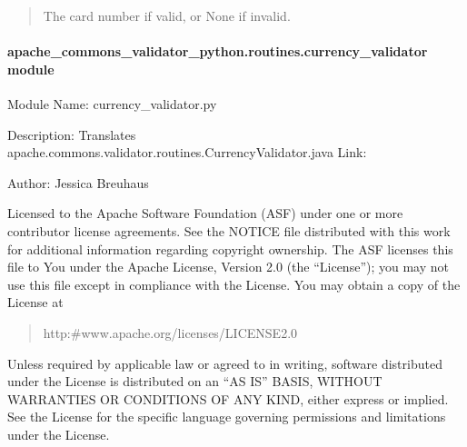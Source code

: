 \documentclass[letterpaper,10pt,english]{sphinxmanual}
\begin{document}
\begin{fulllineitems}
\begin{fulllineitems}
\begin{quote}
\begin{description}
\sphinxAtStartPar
The card number if valid, or None if invalid.

\end{description}\end{quote}

\end{fulllineitems}


\end{fulllineitems}



\paragraph{apache\_commons\_validator\_python.routines.currency\_validator module}
\label{\detokenize{apache_commons_validator_python.routines:module-apache_commons_validator_python.routines.currency_validator}}\label{\detokenize{apache_commons_validator_python.routines:apache-commons-validator-python-routines-currency-validator-module}}
\sphinxAtStartPar
Module Name: currency\_validator.py

\sphinxAtStartPar
Description: Translates apache.commons.validator.routines.CurrencyValidator.java
Link: 

\sphinxAtStartPar
Author: Jessica Breuhaus
\begin{description}
\sphinxAtStartPar
Licensed to the Apache Software Foundation (ASF) under one or more
contributor license agreements.  See the NOTICE file distributed with
this work for additional information regarding copyright ownership.
The ASF licenses this file to You under the Apache License, Version 2.0
(the “License”); you may not use this file except in compliance with
the License.  You may obtain a copy of the License at
\begin{quote}

\sphinxAtStartPar
http:\#www.apache.org/licenses/LICENSE\sphinxhyphen{}2.0
\end{quote}

\sphinxAtStartPar
Unless required by applicable law or agreed to in writing, software
distributed under the License is distributed on an “AS IS” BASIS,
WITHOUT WARRANTIES OR CONDITIONS OF ANY KIND, either express or implied.
See the License for the specific language governing permissions and
limitations under the License.

\end{description}
\end{document}

